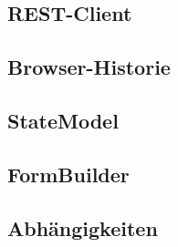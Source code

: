 
\subsection{REST-Client}


\subsection{Browser-Historie}


\subsection{StateModel}


\subsection{FormBuilder}


\subsection{Abhängigkeiten}


